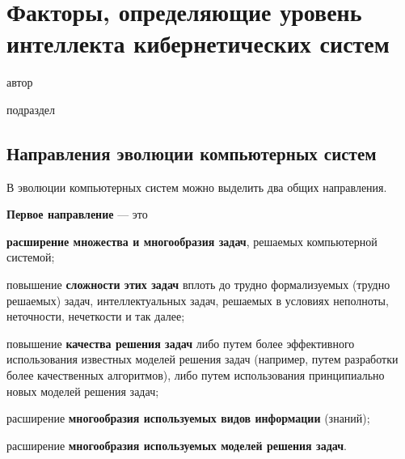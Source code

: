 \chapter{Факторы, определяющие уровень интеллекта кибернетических систем}
{\label{chap_intro}}

\vspace{-7\baselineskip}

\begin{SCn}
\begin{scnrelfromlist}{автор}
\end{scnrelfromlist}


\begin{scnrelfromlist}{подраздел}
\end{scnrelfromlist}

\end{SCn}




\section{Направления эволюции компьютерных систем}
\label{sec_directions_evolution_computer_systems}
В эволюции компьютерных систем можно выделить два общих направления.

\textbf{Первое направление} --- это 
\begin{textitemize}
	\item \textbf{расширение множества и многообразия задач}, решаемых компьютерной системой; 
	\item повышение \textbf{сложности этих задач} вплоть до трудно формализуемых (трудно решаемых) задач, интеллектуальных задач, решаемых в условиях неполноты, неточности, нечеткости и так далее;
	\item повышение \textbf{качества решения задач} либо путем более эффективного использования известных моделей решения задач (например, путем разработки более качественных алгоритмов), либо путем использования принципиально новых моделей решения задач;
	\item расширение \textbf{многообразия используемых видов информации} (знаний);
	\item расширение \textbf{многообразия используемых моделей решения задач}.
\end{textitemize}

